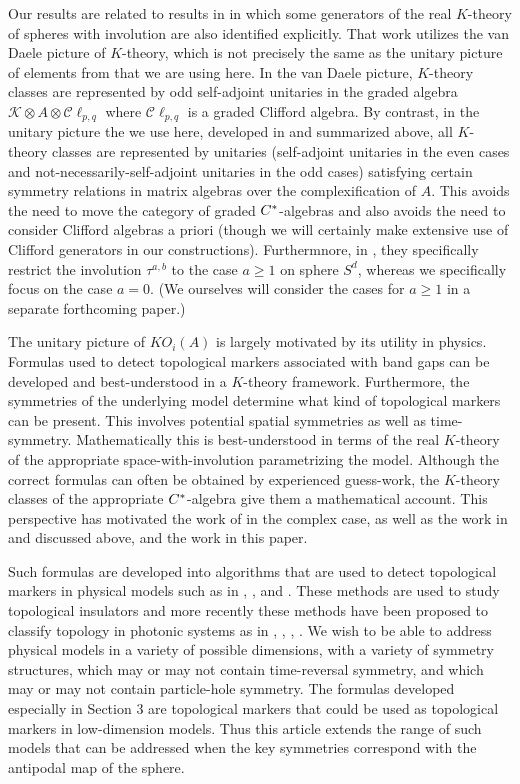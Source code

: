 \documentclass[12pt, reqno]{amsart}
\theoremstyle{definition}
\begin{document}
Our results are related to results in \cite{JosephMeyer} in which some generators of the real $K$-theory of spheres with involution are also identified explicitly. That work utilizes the van Daele picture of $K$-theory, which is not precisely the same as the unitary picture of elements from \cite{BL} that we are using here. In the van Daele picture, $K$-theory classes are represented by odd self-adjoint unitaries in the graded algebra $\mathcal{K} \otimes A \otimes \mathcal{C}\ell_{p,q}$ where $\mathcal{C}\ell_{p,q}$ is a graded Clifford algebra. By contrast, in the unitary picture the we use here, developed in \cite{BL} and summarized above, all $K$-theory classes are represented by unitaries (self-adjoint unitaries in the even cases and not-necessarily-self-adjoint unitaries in the odd cases) satisfying certain symmetry relations in matrix algebras over the complexification of $A$. This avoids the need to move the category of graded $C \sp *$-algebras and also avoids the need to consider Clifford algebras a priori (though we will certainly make extensive use of Clifford generators in our constructions). Furthermnore, in \cite{JosephMeyer}, they specifically restrict the involution $\tau^{a,b}$ to the case $a \geq 1$ on sphere $S^d$, whereas we specifically focus on the case $a = 0$. (We ourselves will consider the cases for $a \geq 1$ in a separate forthcoming paper.)

The unitary picture of $KO_i(A)$ is largely motivated by its utility in physics. Formulas used to detect topological markers associated with band gaps can be developed and best-understood in a $K$-theory framework. Furthermore, the symmetries of the underlying model determine what kind of topological markers can be present. This involves potential spatial symmetries as well as time-symmetry. Mathematically this is best-understood in terms of the real $K$-theory of the appropriate space-with-involution parametrizing the model. Although the correct formulas can often be obtained by experienced guess-work, the $K$-theory classes of the appropriate $C \sp *$-algebra give them a mathematical account. This perspective has motivated the work of \cite{SBS} in the complex case, as well as the work in \cite{BL} and \cite{Boer2020} discussed above, and the work in this paper.

Such formulas are developed into algorithms that are used to detect topological markers in physical models such as in \cite{bradlyn},  \cite{Li...2025}, and \cite{Loring2015}.  These methods are used to study topological insulators and more recently these methods have been proposed to classify topology in photonic systems as in \cite{CL-2022}, \cite{CL2024}, \cite{CLSB-2024}, \cite{DLC-2023}.
We wish to be able to address physical models in a variety of possible dimensions, with a variety of symmetry structures, which may or may not contain time-reversal symmetry, and which may or may not contain particle-hole symmetry. The formulas developed especially in Section 3 are   topological markers that could be used as topological markers in low-dimension models. Thus this article extends the range of such models that can be addressed when the key symmetries correspond with the antipodal map of the sphere.
\end{document}
